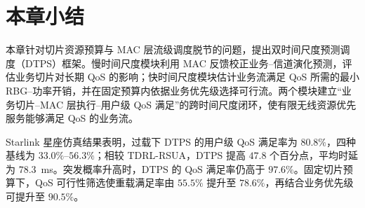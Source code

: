 \section{本章小结}

本章针对切片资源预算与 MAC 层流级调度脱节的问题，提出双时间尺度预测调度（DTPS）框架。慢时间尺度模块利用 MAC 反馈校正业务--信道演化预测，评估业务切片对长期 QoS 的影响；快时间尺度模块估计业务流满足 QoS 所需的最小 RBG--功率开销，并在固定预算内依据业务优先级选择可行流。两个模块建立“业务切片--MAC 层执行--用户级 QoS 满足”的跨时间尺度闭环，使有限无线资源优先服务能够满足 QoS 的业务流。

Starlink 星座仿真结果表明，过载下 DTPS 的用户级 QoS 满足率为 $80.8\%$，四种基线为 $33.0\%$--$56.3\%$；相较 TDRL-RSUA，DTPS 提高 $47.8$ 个百分点，平均时延为 $78.3$~ms。突发概率升高时，DTPS 的 QoS 满足率仍高于 $97.6\%$。固定切片预算下，QoS 可行性筛选使重载满足率由 $55.5\%$ 提升至 $78.6\%$，再结合业务优先级可提升至 $90.5\%$。

